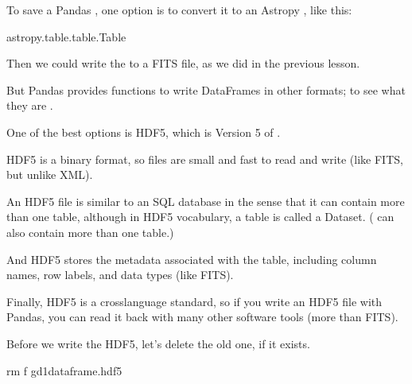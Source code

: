 \documentclass[letterpaper,10pt,english]{sphinxmanual}
\begin{document}
To save a Pandas , one option is to convert it to an Astropy , like this:

\begin{sphinxVerbatim}[commandchars=\\\{\}]
  
\end{sphinxVerbatim}

\begin{sphinxVerbatim}[commandchars=\\\{\}]
astropy.table.table.Table
\end{sphinxVerbatim}

Then we could write the  to a FITS file, as we did in the previous lesson.

But Pandas provides functions to write DataFrames in other formats; to see what they are .

One of the best options is HDF5, which is Version 5 of .

HDF5 is a binary format, so files are small and fast to read and write (like FITS, but unlike XML).

An HDF5 file is similar to an SQL database in the sense that it can contain more than one table, although in HDF5 vocabulary, a table is called a Dataset.  ( can also contain more than one table.)

And HDF5 stores the metadata associated with the table, including column names, row labels, and data types (like FITS).

Finally, HDF5 is a cross\sphinxhyphen{}language standard, so if you write an HDF5 file with Pandas, you can read it back with many other software tools (more than FITS).

Before we write the HDF5, let’s delete the old one, if it exists.

\begin{sphinxVerbatim}[commandchars=\\\{\}]
rm \PYGZhy{}f gd1\PYGZus{}dataframe.hdf5
\end{sphinxVerbatim}
\end{document}
